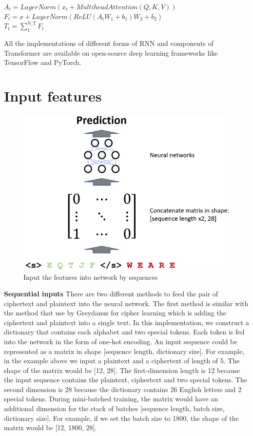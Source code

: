 \begin{center}
\(A_t=LayerNorm(x_t+Multihead Attention(Q,K,V))\)
\\\(F_t=x+LayerNorm(ReLU(A_t W_1+b_1 ) W_2+b_2)\)
\\\(T_t=\sum_1^\text{N_T}F_t \)
\end{center}

All the implementations of different forms of RNN and components of Transformer are available on open-source deep learning frameworks like TensorFlow and PyTorch.


\section{Input features}
\begin{figure}[hbt!]
    \centering
    \includegraphics[width=0.5\linewidth]{myReport//figures/input_seq.png}
    \caption{Input the features into network by sequences}
    \label{fig:enter-label}
\end{figure}

\noindent\textbf{Sequential inputs} \qquad		There are two different methods to feed the pair of ciphertext and plaintext into the neural network. The first method is similar with the method that use by Greydanus \cite{greydanus2017learning} for cipher learning which is adding the ciphertext and plaintext into a single text. In this implementation, we construct a dictionary that contains each alphabet and two special tokens. Each token is fed into the network in the form of one-hot encoding. An input sequence could be represented as a matrix in shape [sequence length, dictionary size]. For example, in the example above we input a plaintext and a ciphertext of length of 5. The shape of the matrix would be [12, 28]. The first-dimension length is 12 because the input sequence contains the plaintext, ciphertext and two special tokens. The second dimension is 28 because the dictionary contains 26 English letters and 2 special tokens. During mini-batched training, the matrix would have an additional dimension for the stack of batches [sequence length, batch size, dictionary size]. For example, if we set the batch size to 1800, the shape of the matrix would be [12, 1800, 28].

